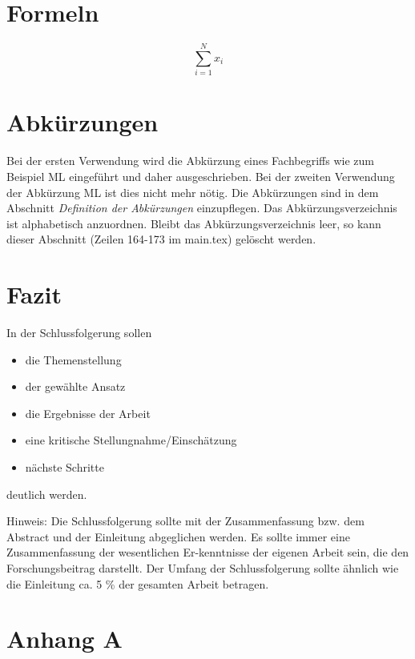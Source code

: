 \documentclass[12pt,oneside]{article}
\begin{document}
\section{Formeln}

\begin{equation}
    \sum_{i=1}^N x_i
    \label{eq:1}
\end{equation}

\section{Abkürzungen}
Bei der ersten Verwendung wird die Abkürzung eines Fachbegriffs wie zum Beispiel \ac{ML} eingeführt und daher ausgeschrieben. Bei der zweiten Verwendung der Abkürzung \ac{ML} ist dies nicht mehr nötig. Die Abkürzungen sind in dem Abschnitt \textit{Definition der Abkürzungen} einzupflegen. Das Abkürzungsverzeichnis ist alphabetisch anzuordnen. Bleibt das Abkürzungsverzeichnis leer, so kann dieser Abschnitt (Zeilen 164-173 im main.tex) gelöscht werden.


\section{Fazit}
In der Schlussfolgerung sollen

\begin{itemize}
\item die Themenstellung
\item der gewählte Ansatz
\item die Ergebnisse der Arbeit
\item eine kritische Stellungnahme/Einschätzung
\item nächste Schritte
\end{itemize}
deutlich werden.

Hinweis:
Die Schlussfolgerung sollte mit der Zusammenfassung bzw. dem Abstract und der Einleitung abgeglichen werden. Es sollte immer eine Zusammenfassung der wesentlichen Er-kenntnisse der eigenen Arbeit sein, die den Forschungsbeitrag darstellt. Der Umfang der Schlussfolgerung sollte ähnlich wie die Einleitung ca. 5 \% der gesamten Arbeit betragen.


\clearpage
\lhead{}
\printbibliography
{}


\clearpage
\appendix
\section{Anhang A} %

\end{document}
